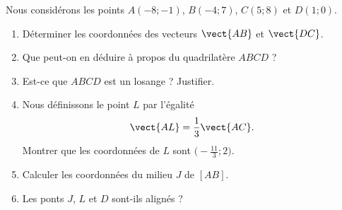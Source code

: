 
\begin{exercice}\label{exosmath-0653}

    Nous considérons les points \( A(-8;-1)\), \( B(-4;7)\), \( C(5;8)\) et \( D(1;0)\).
        \begin{enumerate}
            \item
                Déterminer les coordonnées des vecteurs \( \vect{ AB }\) et \( \vect{ DC }\).
            \item
                Que peut-on en déduire à propos du quadrilatère \( ABCD\) ?
            \item
                Est-ce que \( ABCD\) est un losange ? Justifier.
            \item
                Nous définissons le point \( L\) par l'égalité 
                \begin{equation*}
                    \vect{ AL }=\frac{1}{ 3 }\vect{ AC }.
                \end{equation*}
                Montrer que les coordonnées de \( L\) sont \( \big( -\frac{ 11 }{ 3 };2 \big)\).
            \item
                Calculer les coordonnées du milieu \( J\) de \( [AB]\).
            \item
                Les ponts \( J\), \( L\) et \( D\) sont-ils alignés ?
        \end{enumerate}

\end{exercice}
